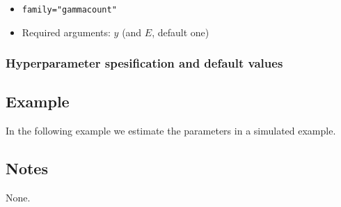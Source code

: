 \documentclass[a4paper,11pt]{article}
\begin{document}
\begin{itemize}
\item \texttt{family="gammacount"}
\item Required arguments: $y$ (and $E$, default one)
\end{itemize}

\subsubsection*{Hyperparameter spesification and default values}



\subsection*{Example}

In the following example we estimate the parameters in a simulated
example.


\subsection*{Notes}

None.
\end{document}
